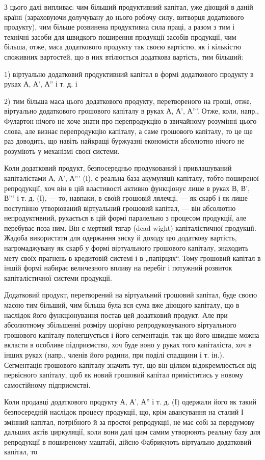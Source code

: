 
З цього далі випливає: чим більший продуктивний капітал, уже
діющий в даній країні (зараховуючи долучувану до нього робочу силу,
витворця додаткового продукту), чим більше розвинена продуктивна сила
праці, а разом з тим і технічні засоби для швидкого поширення продукції
засобів продукції, чим більша, отже, маса додаткового продукту
так своєю вартістю, як і кількістю споживних вартостей, що в них
втілюється додаткова вартість, тим більший:

1) віртуально додатковий продуктивний капітал в формі додаткового
продукту в руках А, А', А'' і т. д. і

2) тим більша маса цього додаткового продукту, перетвореного на
гроші, отже, віртуально додаткового грошового капіталу в руках А, А', А'''.
Отже, коли, напр., Фулартон нічого не хоче знати про перепродукцію
в звичайному розумінні цього слова, але визнає перепродукцію капіталу,
а саме грошового капіталу, то це ще раз доводить, що навіть найкращі
буржуазні економісти абсолютно нічого не розуміють у механізмі своєї
системи.

Коли додатковий продукт, безпосередньо продукований і привлашуваний
капіталістами А, А', А''' (І), є реальна база акумуляції капіталу,
тобто поширеної репродукції, хоч він в цій властивості активно функціонує
лише в руках В, В', В''' і т. д. (І), — то, навпаки, в своїй грошовій
лялечці, — як скарб і як лише поступінно утворюваний віртуальний
грошовий капітал, — він абсолютно непродуктивний, рухається
в цій формі паралельно з процесом продукції, але перебуває поза ним.
Він є мертвий тягар (dead wight) капіталістичної продукції. Жадоба використати
для одержання зиску й доходу цю додаткову вартість, нагромаджувану
як скарб у формі віртуального грошового капіталу, знаходить
мету своїх прагнень в кредитовій системі і в „папірцях“. Тому грошовий
капітал в іншій формі набирає величезного впливу на перебіг і потужний
розвиток капіталістичної системи продукції.

Додатковий продукт, перетворений на віртуальний грошовий капітал,
буде своєю масою тим більший, чим більша була вся сума вже діющого
капіталу, що в наслідок його функціонування постав цей додатковий
продукт. Але при абсолютному збільшенні розміру щорічно репродуковуваного
віртуального грошового капіталу полегшується і його сегментація,
так що його швидше можна вкласти в особливе підприємство, хоч буде
воно у руках того капіталіста, хоч в інших руках (напр., членів його родини,
при поділі спадщини і т. ін.). Сегментація грошового капіталу значить
тут, що він цілком відокремлюється від первісного капіталу, щоб як
новий грошовий капітал приміститись у новому самостійному підприємстві.

Коли продавці додаткового продукту А, А', А'' і т. д. (І) одержали
його як такий безпосередній наслідок процесу продукції, що, крім авансування
на сталий І змінний капітал, потрібного й за простої репродукції,
не має собі за передумову дальших актів циркуляції, коли вони
далі цим самим утворюють реальну базу для репродукції в поширеному
маштабі, дійсно Фабрикують віртуально додатковий капітал, то
\parbreak{}  %
